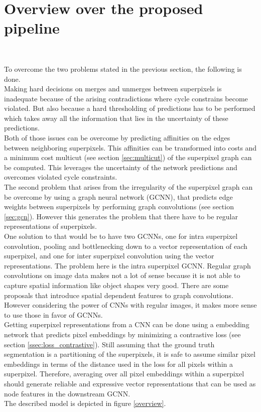 \section{Overview over the proposed pipeline}~\label{seg:ov_pip}

To overcome the two problems stated in the previous section, the following is done.\\
Making hard decisions on merges and unmerges between superpixels is inadequate because of the arising contradictions where cycle constrains become violated. But also because a hard thresholding of predictions has to be performed which takes away all the information that lies in the uncertainty of these predictions.\\
Both of those issues can be overcome by predicting affinities on the edges between neighboring superpixels. This affinities can be transformed into costs and a minimum cost multicut (see section \ref{sec:multicut}) of the superpixel graph can be computed. This leverages the uncertainty of the network predictions and overcomes violated cycle constraints.\\
The second problem that arises from the irregularity of the superpixel graph can be overcome by using a graph neural network (GCNN), that predicts edge weights between superpixels by performing graph convolutions (see section \ref{sec:gcn}). However this generates the problem that there have to be regular representations of superpixels.\\
One solution to that would be to have two GCNNs, one for intra superpixel convolution, pooling and bottlenecking down to a vector representation of each superpixel, and one for inter superpixel convolution using the vector representations. The problem here is the intra superpixel GCNN. Regular graph convolutions on image data makes not a lot of sense because it is not able to capture spatial information like object shapes very good. There are some proposals \cite{monti2016geometric} that introduce spatial dependent features to graph convolutions. However considering the power of CNNs with regular images, it makes more sense to use those in favor of GCNNs.\\
Getting superpixel representations from a CNN can be done using a embedding network that predicts pixel embeddings by minimizing a contrastive loss (see section \ref{ssec:loss_contrastive}). Still assuming that the ground truth segmentation is a partitioning of the superpixels, it is safe to assume similar pixel embeddings in terms of the distance used in the loss for all pixels within a superpixel. Therefore, averaging over all pixel embeddings within a superpixel should generate reliable and expressive vector representations that can be used as node features in the downstream GCNN.\\
The described model is depicted in figure \ref{overview}.


